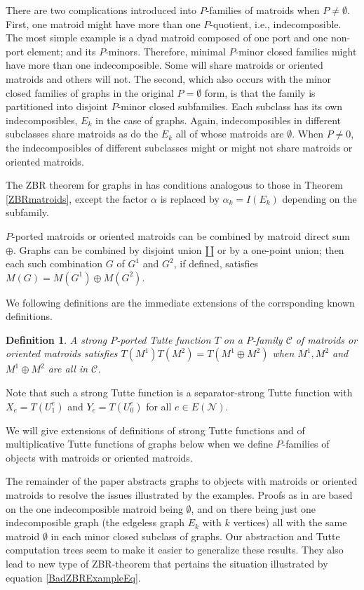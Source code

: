 \documentclass[12pt,leqno]{amsart}
\newtheorem{definition}[lem]{Definition}
\theoremstyle{remark}
\begin{document}
There are two  complications introduced
into $P$-families of matroids when $P\neq\emptyset$.
First, one matroid 
might have more than one $P$-quotient, i.e., indecomposible.
The most simple 
example is a dyad matroid composed of one port and one
non-port element; and its $P$-minors.
Therefore, minimal $P$-minor closed families might have 
more than one indecomposible.  Some will share
matroids or oriented matroids and others will not.
The second, which also occurs with the 
minor closed families of graphs \cite{Ellis-Monaghan-Traldi}
in the original $P=\emptyset$ form, is that
the family is partitioned into disjoint $P$-minor closed
subfamilies.  Each subclass has its own indecomposibles,
$E_k$ in the case of graphs.  Again, 
indecomposibles in different subclasses 
share matroids as do
the $E_k$ all of whose matroids are $\emptyset$.
When $P\neq 0$, the indecomposibles of different 
subclasses might or might not share matroids
or oriented matroids.

The ZBR theorem for graphs in \cite{Ellis-Monaghan-Traldi}
has conditions analogous to those in Theorem \ref{ZBRmatroids},
except the factor $\alpha$ is replaced by $\alpha_k=I(E_k)$
depending on the subfamily.  

$P$-ported matroids or oriented matroids can be combined 
by matroid direct sum $\oplus$.  Graphs can be combined
by disjoint union $\amalg$ or by a one-point union;
then each such combination $G$ of $G^1$ and $G^2$, if defined,
satisfies $M(G)=M(G^1)\oplus M(G^2)$.


We following definitions are the immediate extensions
of the corrsponding known definitions.


\begin{definition}
A \emph{strong} $P$-ported Tutte function $T$ on a $P$-family 
$\mathcal{C}$ of matroids
or oriented matroids satisfies $T(M^1)T(M^2)=T(M^1\oplus M^2)$
when $M^1, M^2$ and $M^1\oplus M^2$ are all in $\mathcal{C}$.
\end{definition}

Note that such a strong Tutte function is a separator-strong
Tutte function with $X_e=T(U^e_1)$ and
$Y_e=T(U^e_0)$ for all $e\in E(\mathcal{N})$.

We will give extensions of definitions of strong Tutte functions
and of multiplicative Tutte functions of graphs below when
we define $P$-families of objects with matroids or oriented 
matroids.

The remainder of the paper abstracts graphs to 
objects with matroids or oriented matroids to 
resolve the issues illustrated by the examples.
Proofs as in 
\cite{Ellis-Monaghan-Traldi}
are based on the one indecomposible matroid 
being $\emptyset$, and on
there being just one indecomposible graph (the edgeless
graph $E_k$ with $k$ vertices) all with the
same matroid $\emptyset$ in each minor
closed subclass of graphs.
Our abstraction and Tutte computation
trees seem to make it easier to generalize
these results.  They also lead to
new type of ZBR-theorem that pertains the
situation illustrated by equation \ref{BadZBRExampleEq}.
\end{document}
